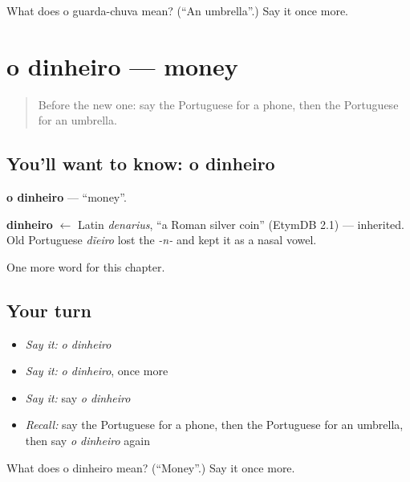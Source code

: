 \begin{tcolorbox}[breakable,colback=teal!4,colframe=teal!35!black,title={Before you move on}]
What does o guarda-chuva mean? (\textquotedblleft{}An umbrella\textquotedblright{}.) Say it once more.
\end{tcolorbox}
\section[o dinheiro]{o dinheiro — money}

\label{lesson:PT-C53-dinheiro}



\begin{quote}
Before the new one: say the Portuguese for a phone, then the Portuguese for an umbrella.
\end{quote}

\subsection*{You'll want to know: o dinheiro}
\textbf{o dinheiro} — \textquotedblleft{}money\textquotedblright{}.

\begin{cousinweb}
\textbf{dinheiro} $\leftarrow$ Latin \emph{denarius}, \textquotedblleft{}a Roman silver coin\textquotedblright{} (EtymDB 2.1) — inherited. Old Portuguese \emph{dĩeiro} lost the \emph{-n-} and kept it as a nasal vowel.
\end{cousinweb}

\begin{grammarlens}[title={What you've built}]
One more word for this chapter.
\end{grammarlens}

\subsection*{Your turn}
\begin{itemize}
\raggedright
  \item \emph{Say it:} \emph{o dinheiro}
  \item \emph{Say it:} \emph{o dinheiro}, once more
  \item \emph{Say it:} say \emph{o dinheiro}
  \item \emph{Recall:} say the Portuguese for a phone, then the Portuguese for an umbrella, then say \emph{o dinheiro} again
\end{itemize}

\begin{tcolorbox}[breakable,colback=teal!4,colframe=teal!35!black,title={Before you move on}]
What does o dinheiro mean? (\textquotedblleft{}Money\textquotedblright{}.) Say it once more.
\end{tcolorbox}
